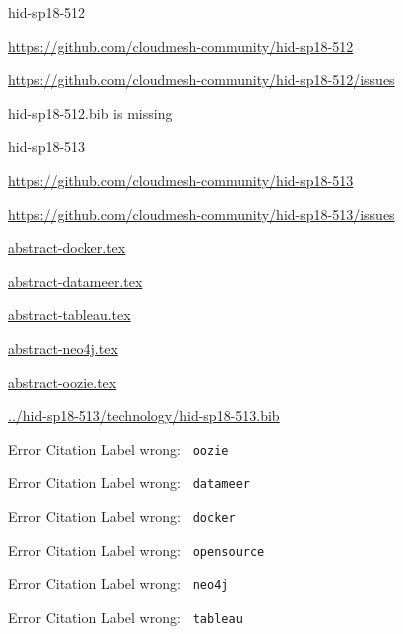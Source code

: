 \begin{IU}

hid-sp18-512

\url{https://github.com/cloudmesh-community/hid-sp18-512}

\url{https://github.com/cloudmesh-community/hid-sp18-512/issues}

hid-sp18-512.bib is missing

\end{IU}


\begin{IU}

hid-sp18-513

\url{https://github.com/cloudmesh-community/hid-sp18-513}

\url{https://github.com/cloudmesh-community/hid-sp18-513/issues}

\href{https://github.com/cloudmesh-community/hid-sp18-513/blob/master//technology/abstract-docker.tex}{abstract-docker.tex}

\href{https://github.com/cloudmesh-community/hid-sp18-513/blob/master//technology/abstract-datameer.tex}{abstract-datameer.tex}

\href{https://github.com/cloudmesh-community/hid-sp18-513/blob/master//technology/abstract-tableau.tex}{abstract-tableau.tex}

\href{https://github.com/cloudmesh-community/hid-sp18-513/blob/master//technology/abstract-neo4j.tex}{abstract-neo4j.tex}

\href{https://github.com/cloudmesh-community/hid-sp18-513/blob/master//technology/abstract-oozie.tex}{abstract-oozie.tex}

\href{https://github.com/cloudmesh-community/hid-sp18-513/blob/master//technology/hid-sp18-513.bib}{../hid-sp18-513/technology/hid-sp18-513.bib}

 Error Citation Label wrong: \verb| oozie |

 Error Citation Label wrong: \verb| datameer |

 Error Citation Label wrong: \verb| docker |

 Error Citation Label wrong: \verb| opensource |

 Error Citation Label wrong: \verb| neo4j |

 Error Citation Label wrong: \verb| tableau |

\end{IU}


